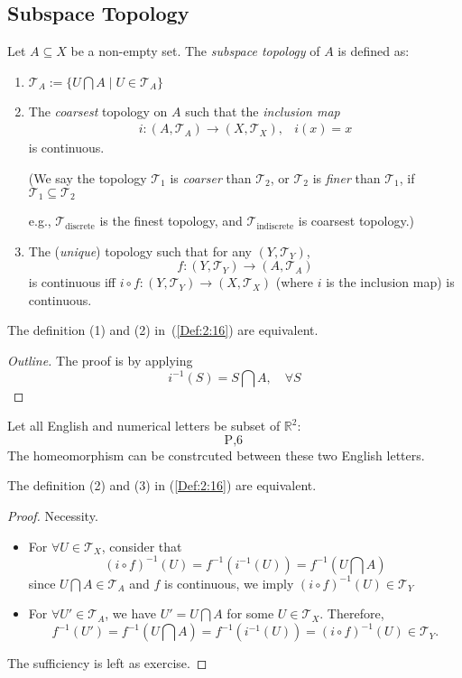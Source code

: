 \subsection{Subspace Topology}
\begin{definition}\label{Def:2:16}
Let $A\subseteq X$ be a non-empty set. 
The \emph{subspace topology} of $A$ is defined as:
\begin{enumerate}
\item
$\mathcal{T}_A:=\{U\bigcap A\mid U\in\mathcal{T}_A\}$
\item
The \emph{coarsest} topology on $A$ such that the \emph{inclusion map}
\[
\begin{array}{ll}
i:(A,\mathcal{T}_A)\to(X,\mathcal{T}_X),
&
i(x)=x
\end{array}
\]
is continuous.

(We say the topology $\mathcal{T}_1$ is \emph{coarser} than $\mathcal{T}_2$, or $\mathcal{T}_2$ is \emph{finer} than $\mathcal{T}_1$, if $\mathcal{T}_1\subseteq\mathcal{T}_2$

e.g., $\mathcal{T}_{\text{discrete}}$ is the finest topology, and $\mathcal{T}_{\text{indiscrete}}$ is coarsest topology.)
\item
The (\emph{unique}) topology such that for any $(Y,\mathcal{T}_Y)$,
\[
f:(Y,\mathcal{T}_Y)\to(A,\mathcal{T}_A)
\]
is continuous iff $i\circ f:(Y,\mathcal{T}_Y)\to(X,\mathcal{T}_X)$ (where $i$ is the inclusion map) is continuous.
\end{enumerate}
\end{definition}
\begin{proposition}
The definition (1) and (2) in~(\ref{Def:2:16}) are equivalent.
\end{proposition}

\begin{proof}[Outline]
The proof is by applying 
\[
i^{-1}(S)=S\bigcap A,\quad
\forall S
\]
\end{proof}

\begin{example}
Let all English and numerical letters be subset of $\mathbb{R}^2$:
\[
\mbox{P},
\mbox{6}
\]
The homeomorphism can be constrcuted between these two English letters.
\end{example}

\begin{proposition}
The definition (2) and (3) in (\ref{Def:2:16}) are equivalent.
\end{proposition}
\begin{proof}
Necessity. 
\begin{itemize}
\item
For $\forall U\in\mathcal{T}_X$, consider that
\[
(i\circ f)^{-1}(U)=f^{-1}(i^{-1}(U))=f^{-1}(U\bigcap A)
\]
since $U\bigcap A\in\mathcal{T}_A$ and $f$ is continuous, we imply $(i\circ f)^{-1}(U)\in\mathcal{T}_Y$
\item
For $\forall U'\in\mathcal{T}_A$, we have $U'=U\bigcap A$ for some $U\in\mathcal{T}_X$. Therefore,
\[
f^{-1}(U')=f^{-1}(U\bigcap A)=f^{-1}(i^{-1}(U))=(i\circ f)^{-1}(U)\in\mathcal{T}_Y.
\]
\end{itemize}
The sufficiency is left as exercise.
\end{proof}


